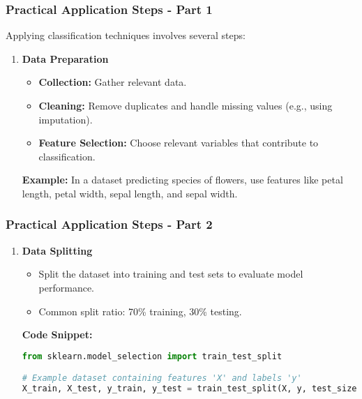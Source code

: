 \documentclass[aspectratio=169]{beamer}
\begin{document}
\begin{frame}
    \frametitle{Practical Application Steps - Part 1}
    Applying classification techniques involves several steps:
    \begin{enumerate}
        \item \textbf{Data Preparation}
        \begin{itemize}
            \item \textbf{Collection:} Gather relevant data.
            \item \textbf{Cleaning:} Remove duplicates and handle missing values (e.g., using imputation).
            \item \textbf{Feature Selection:} Choose relevant variables that contribute to classification.
        \end{itemize}
        \textbf{Example:} In a dataset predicting species of flowers, use features like petal length, petal width, sepal length, and sepal width.
    \end{enumerate}
\end{frame}

\begin{frame}[fragile]
    \frametitle{Practical Application Steps - Part 2}
    \begin{enumerate}[resume]
        \item \textbf{Data Splitting}
        \begin{itemize}
            \item Split the dataset into training and test sets to evaluate model performance.
            \item Common split ratio: 70\% training, 30\% testing.
        \end{itemize}
        \textbf{Code Snippet:}
        \begin{lstlisting}[language=Python]
from sklearn.model_selection import train_test_split

# Example dataset containing features 'X' and labels 'y'
X_train, X_test, y_train, y_test = train_test_split(X, y, test_size=0.3, random_state=42)
        \end{lstlisting}
    \end{enumerate}
\end{frame}
\end{document}
